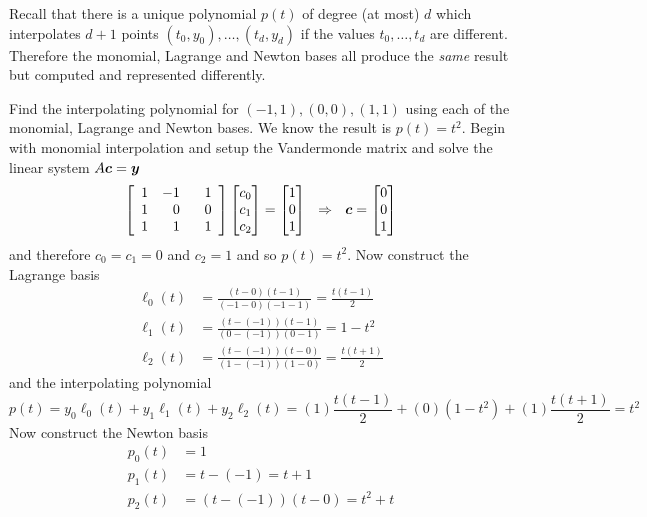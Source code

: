 \begin{note}
Recall that there is a unique polynomial $p(t)$ of degree (at most) $d$ which interpolates $d+1$ points $(t_0,y_0), \dots , (t_d,y_d)$ if the values $t_0,\dots,t_d$ are different. Therefore the monomial, Lagrange and Newton bases all produce the {\it same} result but computed and represented differently. 
\end{note}

\begin{example}
Find the interpolating polynomial for $(-1,1),(0,0),(1,1)$ using each of the monomial, Lagrange and Newton bases. We know the result is $p(t) = t^2$. Begin with monomial interpolation and setup the Vandermonde matrix and solve the linear system $A \boldsymbol{c} = \boldsymbol{y}$
$$
\left[ \begin{array}{rrr} 1 & -1 & \phantom{+}1 \\ 1 & 0 & 0 \\ 1 & 1 & 1 \end{array} \right]
\begin{bmatrix} c_0 \\ c_1 \\ c_2 \end{bmatrix}
=
\begin{bmatrix} 1 \\ 0 \\ 1 \end{bmatrix}
\ \
\Rightarrow
\ \
\boldsymbol{c} = \begin{bmatrix} 0 \\ 0 \\ 1 \end{bmatrix}
$$
and therefore $c_0 = c_1 = 0$ and $c_2 = 1$ and so $p(t) = t^2$. Now construct the Lagrange basis
\begin{align*}
\ell_0(t) &= \frac{(t - 0)(t - 1)}{(-1 - 0)(-1 - 1)} = \frac{t(t-1)}{2} \\
\ell_1(t) &= \frac{(t - (-1))(t - 1)}{(0 - (-1))(0 - 1)} = 1-t^2 \\
\ell_2(t) &= \frac{(t - (-1))(t - 0)}{(1 - (-1))(1 - 0)} = \frac{t(t+1)}{2}
\end{align*}
and the interpolating polynomial
$$
p(t) = y_0 \ell_0(t) + y_1 \ell_1(t) + y_2 \ell_2(t) = (1)\frac{t(t-1)}{2} + (0) (1-t^2) + (1) \frac{t(t+1)}{2} = t^2
$$
Now construct the Newton basis
\begin{align*}
p_0(t) &= 1 \\
p_1(t) &= t - (-1) = t + 1 \\
p_2(t) &= (t - (-1))(t - 0) = t^2 + t
\end{align*}

\end{example}
